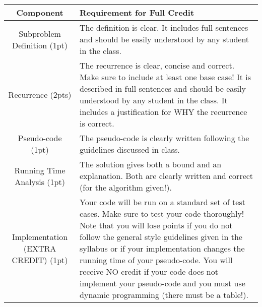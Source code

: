 \documentclass[11pt,answers]{exam}
\begin{document}
\begin{center}
  \begin{tabular}{| c | p{10cm} |}
	\hline
	Component & Requirement for Full Credit\\
    \hline
    Subproblem Definition  (1pt) & The definition is clear.  It includes full sentences and should be easily understood by any student in the class. \\ \hline
  Recurrence  (2pts) & The recurrence is clear, concise and correct.  Make sure to include at least one base case!  It is described in full sentences and should be easily understood by any student in the class. It includes a justification for WHY the recurrence is correct. \\ \hline
	Pseudo-code  (1pt) & The pseudo-code is clearly written following the guidelines discussed in class.\\ \hline
	Running Time Analysis  (1pt) & The solution gives both a bound and an explanation.  Both are clearly written and correct (for the algorithm given!).  \\ \hline
  Implementation (EXTRA CREDIT) (1pt) & Your code will be run on a standard set of test cases.  Make sure to test your code thoroughly!  Note that you will lose points if you do not follow the general style guidelines given in the syllabus or if your implementation changes the running time of your pseudo-code.  You will receive NO credit if your code does not implement your pseudo-code and you must use dynamic programming (there must be a table!).  \\ \hline
		
  \end{tabular}
\end{center}
   \\
   
\end{document}

